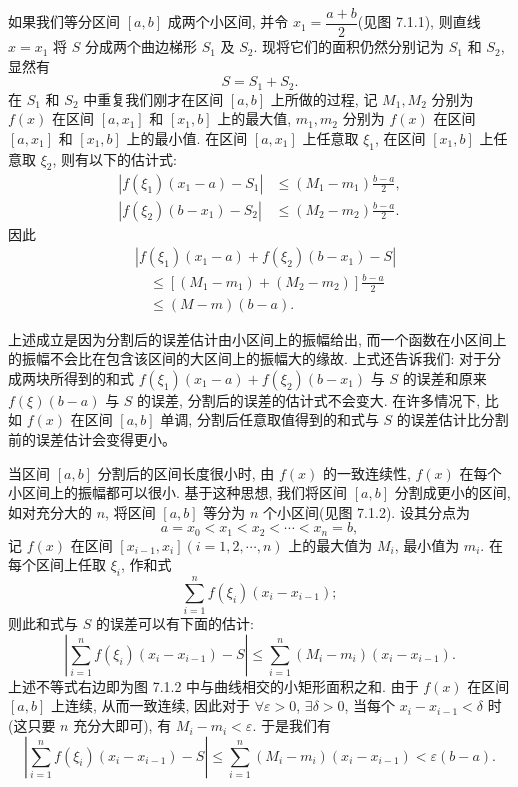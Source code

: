 \documentclass[UTF8, 12pt, fontset=fandol, oneside]{ctexart}
\begin{document}
如果我们等分区间 $[a,b]$ 成两个小区间, 并令 $x_1=\dfrac{a+b}{2}$(见图 7.1.1), 则直线 $x=x_1$ 将 $S$ 分成两个曲边梯形 $S_1$ 及 $S_2$. 现将它们的面积仍然分别记为 $S_1$ 和 $S_2$, 显然有
\[
  S=S_1+S_2.
\]
在 $S_1$ 和 $S_2$ 中重复我们刚才在区间 $[a,b]$ 上所做的过程, 记 $M_1,M_2$ 分别为 $f(x)$ 在区间 $[a,x_1]$ 和 $[x_1,b]$ 上的最大值, $m_1,m_2$ 分别为 $f(x)$ 在区间 $[a,x_1]$ 和 $[x_1,b]$ 上的最小值. 在区间 $[a,x_1]$ 上任意取 $\xi_1$, 在区间 $[x_1,b]$ 上任意取 $\xi_2$, 则有以下的估计式:
\[
\begin{aligned}
  |f(\xi_1)(x_1-a)-S_1|&\leq (M_1-m_1)\frac{b-a}{2},\\
  |f(\xi_2)(b-x_1)-S_2|&\leq (M_2-m_2)\frac{b-a}{2}.
\end{aligned}
\]
因此
\[
\begin{aligned}
  &|f(\xi_1)(x_1-a)+f(\xi_2)(b-x_1)-S|\\
  &\quad\leq [(M_1-m_1)+(M_2-m_2)]\frac{b-a}{2}\\
  &\quad\leq (M-m)(b-a).
\end{aligned}
\]

上述成立是因为分割后的误差估计由小区间上的振幅给出, 而一个函数在小区间上的振幅不会比在包含该区间的大区间上的振幅大的缘故. 上式还告诉我们: 对于分成两块所得到的和式 $f(\xi_1)(x_1-a)+f(\xi_2)(b-x_1)$ 与 $S$ 的误差和原来 $f(\xi)(b-a)$ 与 $S$ 的误差, 分割后的误差的估计式不会变大. 在许多情况下, 比如 $f(x)$ 在区间 $[a,b]$ 单调, 分割后任意取值得到的和式与 $S$ 的误差估计比分割前的误差估计会变得更小。

当区间 $[a,b]$ 分割后的区间长度很小时, 由 $f(x)$ 的一致连续性, $f(x)$ 在每个小区间上的振幅都可以很小. 基于这种思想, 我们将区间 $[a,b]$ 分割成更小的区间, 如对充分大的 $n$, 将区间 $[a,b]$ 等分为 $n$ 个小区间(见图 7.1.2). 设其分点为
\[
  a=x_0<x_1<x_2<\cdots<x_n=b,
\]
记 $f(x)$ 在区间 $[x_{i-1},x_i](i=1,2,\cdots,n)$ 上的最大值为 $M_i$, 最小值为 $m_i$. 在每个区间上任取 $\xi_i$, 作和式
\[
  \sum_{i=1}^n f(\xi_i)(x_i-x_{i-1});
\]
则此和式与 $S$ 的误差可以有下面的估计:
\begin{equation}
  \left|\sum_{i=1}^n f(\xi_i)(x_i-x_{i-1})-S\right|
  \leq \sum_{i=1}^n (M_i-m_i)(x_i-x_{i-1}).
  \tag{7.1.1}
\end{equation}
上述不等式右边即为图 7.1.2 中与曲线相交的小矩形面积之和. 由于 $f(x)$ 在区间 $[a,b]$ 上连续, 从而一致连续, 因此对于 $\forall\varepsilon>0$, $\exists\delta>0$, 当每个 $x_i-x_{i-1}<\delta$ 时(这只要 $n$ 充分大即可), 有 $M_i-m_i<\varepsilon$. 于是我们有
\[
  \left|\sum_{i=1}^n f(\xi_i)(x_i-x_{i-1})-S\right|
  \leq \sum_{i=1}^n (M_i-m_i)(x_i-x_{i-1})<\varepsilon(b-a).
\]
\end{document}
